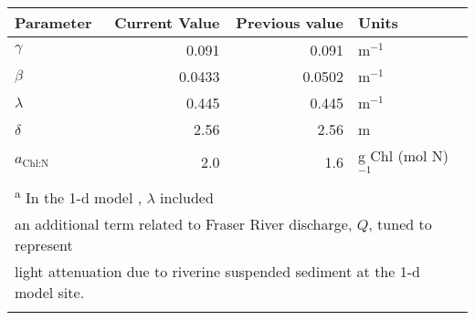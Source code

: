    \small
   \centering
   \begin{tabular}{lrrl}\toprule
    Parameter & Current Value & Previous value & Units \\ \midrule
     $\gamma$ & 0.091 & 0.091 & m$^{-1}$ \\
     $\beta$ & 0.0433 & 0.0502 & m$^{-1}$ \\
     $\lambda$ & 0.445 & 0.445 & m$^{-1}$ \\
     $\delta$ & 2.56 & 2.56 & m \\
     $a_{\textrm{Chl:N}}$ & 2.0 & 1.6 & g Chl (mol N)$^{-1}$ \\
   \midrule
\multicolumn{4}{l}{\textsuperscript{a} \footnotesize In the 1-d model \cite{Collins2009, AllenWolfe2013}, $\lambda$ included } \\\multicolumn{4}{l}{\footnotesize an additional term related to Fraser River discharge, $Q$, tuned to represent } \\\multicolumn{4}{l}{\footnotesize light attenuation due to riverine suspended sediment at the 1-d model site.} \\ \\   \end{tabular}
